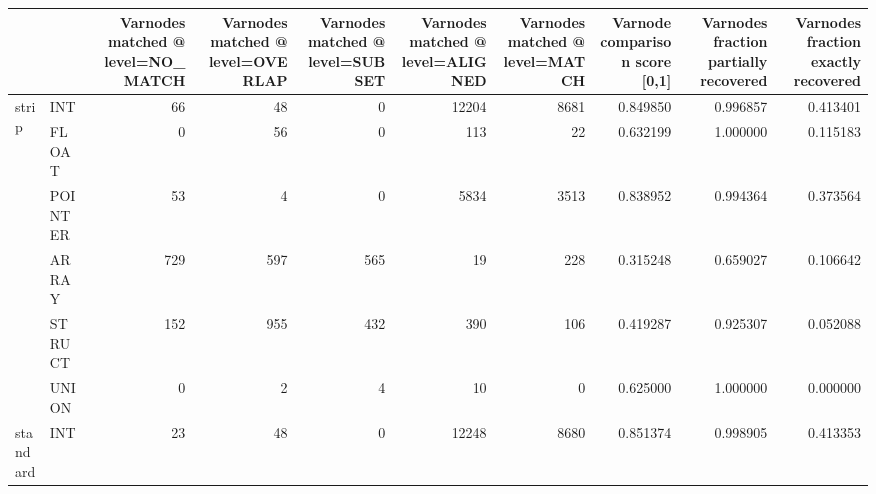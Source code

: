 \begin{tabular}{llrrrrrrrr}
\toprule
      &       &  Varnodes matched @ level=NO\_MATCH &  Varnodes matched @ level=OVERLAP &  Varnodes matched @ level=SUBSET &  Varnodes matched @ level=ALIGNED &  Varnodes matched @ level=MATCH &  Varnode comparison score [0,1] &  Varnodes fraction partially recovered &  Varnodes fraction exactly recovered \\
\midrule
\multirow{6}{*}{strip} & INT &                                 66 &                                48 &                                0 &                             12204 &                            8681 &                        0.849850 &                               0.996857 &                             0.413401 \\
      & FLOAT &                                  0 &                                56 &                                0 &                               113 &                              22 &                        0.632199 &                               1.000000 &                             0.115183 \\
      & POINTER &                                 53 &                                 4 &                                0 &                              5834 &                            3513 &                        0.838952 &                               0.994364 &                             0.373564 \\
      & ARRAY &                                729 &                               597 &                              565 &                                19 &                             228 &                        0.315248 &                               0.659027 &                             0.106642 \\
      & STRUCT &                                152 &                               955 &                              432 &                               390 &                             106 &                        0.419287 &                               0.925307 &                             0.052088 \\
      & UNION &                                  0 &                                 2 &                                4 &                                10 &                               0 &                        0.625000 &                               1.000000 &                             0.000000 \\
\cline{1-10}
\multirow{6}{*}{standard} & INT &                                 23 &                                48 &                                0 &                             12248 &                            8680 &                        0.851374 &                               0.998905 &                             0.413353 \\

\end{tabular}
